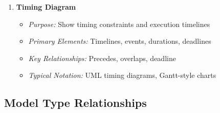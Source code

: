\documentclass[11pt,letterpaper]{article}
\begin{document}
\begin{enumerate}[label=\textbf{MT\arabic*:}, leftmargin=2.5em]
    \item \textbf{Timing Diagram}
    \begin{itemize}[nosep]
        \item \textit{Purpose:} Show timing constraints and execution timelines
        \item \textit{Primary Elements:} Timelines, events, durations, deadlines
        \item \textit{Key Relationships:} Precedes, overlaps, deadline
        \item \textit{Typical Notation:} UML timing diagrams, Gantt-style charts
    \end{itemize}
\end{enumerate}

\subsection{Model Type Relationships}
\end{document}
